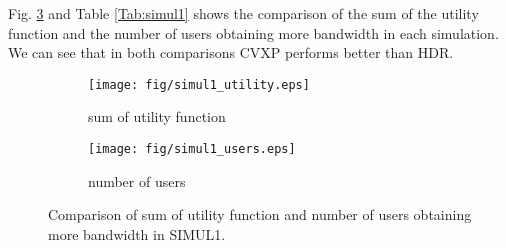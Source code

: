 	Fig. \ref{figure:simul1} and Table \ref{Tab:simul1} shows the comparison of the sum of the utility function and the number of users obtaining more bandwidth in each simulation. We can see that in both comparisons CVXP performs better than HDR.
	
	\begin{figure}
		\begin{center}
			\begin{subfigure}[b]{0.4\textwidth}
				\texttt{[image: fig/simul1\_utility.eps]}
				\caption{sum of utility function}
				\label{figure:simul1_a}
			\end{subfigure}
			\begin{subfigure}[b]{0.4\textwidth}
				\texttt{[image: fig/simul1\_users.eps]}
				\caption{number of users}
				\label{figure:simul1_b}
			\end{subfigure}
			\caption{Comparison of sum of utility function and number of users obtaining more bandwidth in SIMUL1.}
			\label{figure:simul1}
		\end{center}
	\end{figure}

